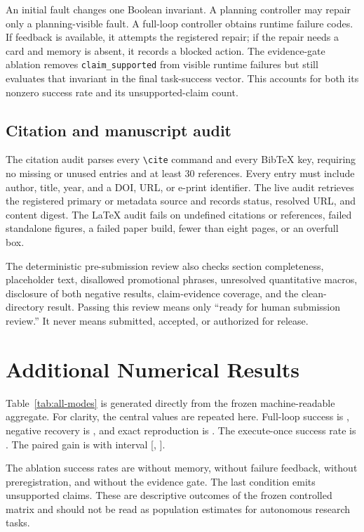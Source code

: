 An initial fault changes one Boolean invariant. A planning controller may
repair only a planning-visible fault. A full-loop controller obtains runtime
failure codes. If feedback is available, it attempts the registered repair;
if the repair needs a \vault{} card and memory is absent, it records a blocked
action. The evidence-gate ablation removes \texttt{claim\_supported} from
visible runtime failures but still evaluates that invariant in the final
task-success vector. This accounts for both its nonzero success rate and its
unsupported-claim count.

\subsection{Citation and manuscript audit}

The citation audit parses every \texttt{\textbackslash cite} command and every
BibTeX key, requiring no missing or unused entries and at least 30 references.
Every entry must include author, title, year, and a DOI, URL, or e-print
identifier. The live audit retrieves the registered primary or metadata
source and records status, resolved URL, and content digest. The LaTeX audit
fails on undefined citations or references, failed standalone figures, a
failed paper build, fewer than eight pages, or an overfull box.

The deterministic pre-submission review also checks section completeness,
placeholder text, disallowed promotional phrases, unresolved quantitative
macros, disclosure of both negative \routea{} results, claim-evidence
coverage, and the clean-directory result. Passing this review means only
``ready for human submission review.'' It never means submitted, accepted, or
authorized for release.

\section{Additional Numerical Results}

Table~\ref{tab:all-modes} is generated directly from the frozen
machine-readable aggregate. For clarity, the central values are repeated
here. Full-loop success is \FullLoopSuccess{}, negative recovery is
\FullLoopRecovery{}, and exact reproduction is \FullLoopReproduction{}.
The execute-once success rate is \ExecuteOnceSuccess{}. The paired gain is
\PairedGain{} with interval [\PairedCILower{}, \PairedCIUpper{}].

The ablation success rates are \NoVaultSuccess{} without \vault{} memory,
\NoFeedbackSuccess{} without failure feedback, \NoPreregSuccess{} without
preregistration, and \NoGateSuccess{} without the evidence gate. The last
condition emits \NoGateUnsupported{} unsupported claims. These are descriptive
outcomes of the frozen controlled matrix and should not be read as population
estimates for autonomous research tasks.

